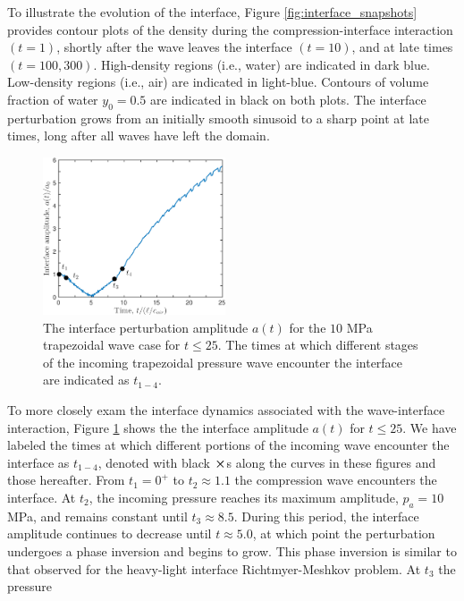 % 
To illustrate the evolution of the interface, Figure
\ref{fig:interface_snapshots} provides contour plots of the density
during the compression-interface interaction $(t=1)$, shortly after
the wave leaves the interface $(t=10)$, and at late times
$(t=100, 300)$. High-density regions (i.e., water) are indicated in
dark blue. Low-density regions (i.e., air) are indicated in
light-blue. Contours of volume fraction of water $y_0=0.5$ are indicated in
black on both plots. The interface perturbation grows from an
initially smooth sinusoid to a sharp point at late times, long after
all waves have left the domain.
% 
\begin{figure}[h] 
  \centering
  \includegraphics[width=0.48\textwidth]{./figs/lung_figs/trapz10_intf_schematic}
  \caption[The interface perturbation amplitude for $t\leq25$]{The
    interface perturbation amplitude $a(t)$ for the $10$ MPa
    trapezoidal wave case for $t\leq25$. The times at which different
    stages of the incoming trapezoidal pressure wave encounter the
    interface are indicated as $t_{1-4}$.  }
  \label{fig:trapz10_interface}
\end{figure}\par
% 
To more closely exam the interface dynamics associated with the
wave-interface interaction, Figure \ref{fig:trapz10_interface} shows
the the interface amplitude $a(t)$ for $t\leq25$. We have labeled the
times at which different portions of the incoming wave encounter the
interface as $t_{1-4}$, denoted with black $\boldsymbol{\times}$s along the
curves in these figures and those hereafter. From $t_1=0^+$ to
$t_2\approx1.1$ the compression wave encounters the interface. At
$t_2$, the incoming pressure reaches its maximum amplitude, $p_a=10$
MPa, and remains constant until $t_3\approx8.5$. During this period,
the interface amplitude continues to decrease until $t\approx 5.0$, at
which point the perturbation undergoes a phase inversion and begins to
grow. This phase inversion is similar to that observed for the
heavy-light interface Richtmyer-Meshkov problem. At $t_3$ the pressure
